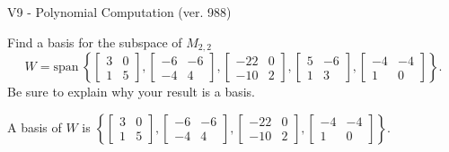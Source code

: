 \begin{exercise}
  \begin{exerciseTitle}V9 - Polynomial Computation (ver. 988)\end{exerciseTitle}
  \begin{exerciseStatement}
    Find a basis for the subspace of \(M_{2,2}\) 
\[W=\mathrm{span}\ \left\{\left[\begin{array}{cc}
3 & 0 \\
1 & 5
\end{array}\right] , \left[\begin{array}{cc}
-6 & -6 \\
-4 & 4
\end{array}\right] , \left[\begin{array}{cc}
-22 & 0 \\
-10 & 2
\end{array}\right] , \left[\begin{array}{cc}
5 & -6 \\
1 & 3
\end{array}\right] , \left[\begin{array}{cc}
-4 & -4 \\
1 & 0
\end{array}\right]\right\}.\]
 Be sure to explain why your result is a basis.


  \end{exerciseStatement}
  \begin{exerciseAnswer}
   A basis of \(W\) is  \(\left\{\left[\begin{array}{cc}
3 & 0 \\
1 & 5
\end{array}\right] , \left[\begin{array}{cc}
-6 & -6 \\
-4 & 4
\end{array}\right] , \left[\begin{array}{cc}
-22 & 0 \\
-10 & 2
\end{array}\right] , \left[\begin{array}{cc}
-4 & -4 \\
1 & 0
\end{array}\right]\right\}\).
  


  \end{exerciseAnswer}
\end{exercise}
